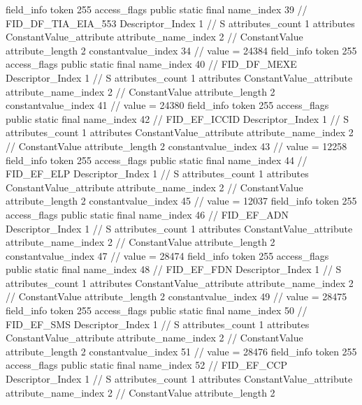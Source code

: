 {{{{{{				}
			}
			field_info {
				token	255
				access_flags	public static final
				name_index	39		// FID_DF_TIA_EIA_553
				Descriptor_Index	1		// S
				attributes_count	1
				attributes {
				ConstantValue_attribute {
					attribute_name_index	2		// ConstantValue
					attribute_length	2
					constantvalue_index	34		// value = 24384
				}
				}
			}
			field_info {
				token	255
				access_flags	public static final
				name_index	40		// FID_DF_MEXE
				Descriptor_Index	1		// S
				attributes_count	1
				attributes {
				ConstantValue_attribute {
					attribute_name_index	2		// ConstantValue
					attribute_length	2
					constantvalue_index	41		// value = 24380
				}
				}
			}
			field_info {
				token	255
				access_flags	public static final
				name_index	42		// FID_EF_ICCID
				Descriptor_Index	1		// S
				attributes_count	1
				attributes {
				ConstantValue_attribute {
					attribute_name_index	2		// ConstantValue
					attribute_length	2
					constantvalue_index	43		// value = 12258
				}
				}
			}
			field_info {
				token	255
				access_flags	public static final
				name_index	44		// FID_EF_ELP
				Descriptor_Index	1		// S
				attributes_count	1
				attributes {
				ConstantValue_attribute {
					attribute_name_index	2		// ConstantValue
					attribute_length	2
					constantvalue_index	45		// value = 12037
				}
				}
			}
			field_info {
				token	255
				access_flags	public static final
				name_index	46		// FID_EF_ADN
				Descriptor_Index	1		// S
				attributes_count	1
				attributes {
				ConstantValue_attribute {
					attribute_name_index	2		// ConstantValue
					attribute_length	2
					constantvalue_index	47		// value = 28474
				}
				}
			}
			field_info {
				token	255
				access_flags	public static final
				name_index	48		// FID_EF_FDN
				Descriptor_Index	1		// S
				attributes_count	1
				attributes {
				ConstantValue_attribute {
					attribute_name_index	2		// ConstantValue
					attribute_length	2
					constantvalue_index	49		// value = 28475
				}
				}
			}
			field_info {
				token	255
				access_flags	public static final
				name_index	50		// FID_EF_SMS
				Descriptor_Index	1		// S
				attributes_count	1
				attributes {
				ConstantValue_attribute {
					attribute_name_index	2		// ConstantValue
					attribute_length	2
					constantvalue_index	51		// value = 28476
				}
				}
			}
			field_info {
				token	255
				access_flags	public static final
				name_index	52		// FID_EF_CCP
				Descriptor_Index	1		// S
				attributes_count	1
				attributes {
				ConstantValue_attribute {
					attribute_name_index	2		// ConstantValue
					attribute_length	2
}}}}}}}
